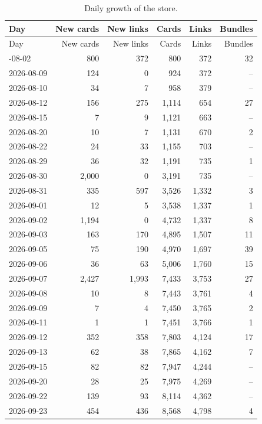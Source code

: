 \begin{longtable}{lrrrrr}
\caption{Daily growth of the store.}\label{tab:growth-days}\\
\toprule
Day & New cards & New links & Cards & Links & Bundles\\
\midrule\endfirsthead
\toprule Day & New cards & New links & Cards & Links & Bundles\\ \midrule\endhead
\bottomrule\endfoot
2026-08-02 & 800 & 372 & 800 & 372 & 32\\
2026-08-09 & 124 & 0 & 924 & 372 & --\\
2026-08-10 & 34 & 7 & 958 & 379 & --\\
2026-08-12 & 156 & 275 & 1{,}114 & 654 & 27\\
2026-08-15 & 7 & 9 & 1{,}121 & 663 & --\\
2026-08-20 & 10 & 7 & 1{,}131 & 670 & 2\\
2026-08-22 & 24 & 33 & 1{,}155 & 703 & --\\
2026-08-29 & 36 & 32 & 1{,}191 & 735 & 1\\
2026-08-30 & 2{,}000 & 0 & 3{,}191 & 735 & --\\
2026-08-31 & 335 & 597 & 3{,}526 & 1{,}332 & 3\\
2026-09-01 & 12 & 5 & 3{,}538 & 1{,}337 & 1\\
2026-09-02 & 1{,}194 & 0 & 4{,}732 & 1{,}337 & 8\\
2026-09-03 & 163 & 170 & 4{,}895 & 1{,}507 & 11\\
2026-09-05 & 75 & 190 & 4{,}970 & 1{,}697 & 39\\
2026-09-06 & 36 & 63 & 5{,}006 & 1{,}760 & 15\\
2026-09-07 & 2{,}427 & 1{,}993 & 7{,}433 & 3{,}753 & 27\\
2026-09-08 & 10 & 8 & 7{,}443 & 3{,}761 & 4\\
2026-09-09 & 7 & 4 & 7{,}450 & 3{,}765 & 2\\
2026-09-11 & 1 & 1 & 7{,}451 & 3{,}766 & 1\\
2026-09-12 & 352 & 358 & 7{,}803 & 4{,}124 & 17\\
2026-09-13 & 62 & 38 & 7{,}865 & 4{,}162 & 7\\
2026-09-15 & 82 & 82 & 7{,}947 & 4{,}244 & --\\
2026-09-20 & 28 & 25 & 7{,}975 & 4{,}269 & --\\
2026-09-22 & 139 & 93 & 8{,}114 & 4{,}362 & --\\
2026-09-23 & 454 & 436 & 8{,}568 & 4{,}798 & 4\\

\end{longtable}
